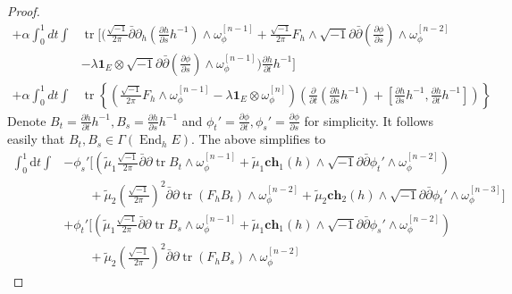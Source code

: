 \documentclass[10pt, letterpaper]{amsart}
\newcommand{\tr}{\operatorname{tr}}
\newcommand{\End}{\operatorname{End}}
\theoremstyle{plain}
\theoremstyle{definition}
\numberwithin{equation}{section}
\begin{document}
\begin{proof}
\begin{equation}
\begin{split}
     + 
    \alpha\int_0^1 dt \int 
    & \tr \Bigg[
    \Bigg(\frac{\sqrt{-1}}{2\pi}\bar\partial \partial_h\left(\frac{\partial h}{\partial s}h^{-1}\right)\wedge\omega_\phi^{[n-1]}
    + 
    \frac{\sqrt{-1}}{2\pi}F_h \wedge \sqrt{-1}\partial\bar\partial\left(\frac{\partial\phi}{\partial s}\right)\wedge\omega_\phi^{[n-2]}\\
   & -
    \lambda \mathbf{1}_E\otimes \sqrt{-1}\partial\bar\partial\left(\frac{\partial\phi}{\partial s}\right)\wedge\omega_\phi^{[n-1]}\Bigg)\frac{\partial h}{\partial t}h^{-1}
    \Bigg]\\
     + 
    \alpha\int_0^1 dt\int 
    & \tr
    \left\{ 
    \left(
    \frac{\sqrt{-1}}{2\pi}F_h\wedge \omega_\phi^{[n-1]}
    - 
    \lambda \mathbf{1}_E \otimes \omega_\phi^{[n]}\right)
    \left(\frac{\partial}{\partial t}\left( \frac{\partial h}{\partial s}h^{-1}\right)
    + 
    \left[\frac{\partial h}{\partial s}h^{-1},\frac{\partial h}{\partial t}h^{-1} \right]
    \right)
    \right\}
\end{split}
\end{equation}
Denote $B_t=\frac{\partial h}{\partial t}h^{-1}, B_s=\frac{\partial h}{\partial s}h^{-1}$ and $\phi_t'=\frac{\partial \phi}{\partial t}, \phi_s'=\frac{\partial \phi}{\partial s}$ for simplicity. It follows easily that $B_t, B_s\in \Gamma\left(\End_h E\right)$. The above simplifies to 
\begin{equation}
    \begin{split}
    \int_0^1 \mathrm{d}t \int 
    &- 
    \phi_s'
    \Bigg[ \left( \widetilde\mu_1 \frac{\sqrt{-1}}{2\pi}\bar\partial \partial \tr B_t\wedge \omega_\phi^{[n-1]} 
    + 
    \widetilde\mu_1 \mathbf{ch}_1\left(h\right)\wedge \sqrt{-1}\partial\bar\partial\phi_t'\wedge \omega_\phi^{[n-2]}\right)\\
    & \qquad + 
    \widetilde\mu_2 \left(\frac{\sqrt{-1}}{2\pi}\right)^2\bar\partial \partial \tr \left( F_h B_t\right)\wedge\omega_\phi^{[n-2]}
    + 
    \widetilde\mu_2 \mathbf{ch}_2\left(h\right)\wedge \sqrt{-1}\partial\bar\partial \phi_t'\wedge \omega_\phi^{[n-3]}\Bigg]\\
    &+ 
    \phi_t'
    \Bigg[ \left( \widetilde\mu_1 \frac{\sqrt{-1}}{2\pi}\bar\partial\partial \tr B_s\wedge \omega_\phi^{[n-1]} 
    + 
    \widetilde\mu_1 \mathbf{ch}_1\left(h\right)\wedge \sqrt{-1}\partial\bar\partial\phi_s'\wedge \omega_\phi^{[n-2]}\right)\\
    & \qquad + 
    \widetilde\mu_2 \left(\frac{\sqrt{-1}}{2\pi}\right)^2\bar\partial \partial \tr \left( F_hB_s\right)\wedge\omega_\phi^{[n-2]}

\end{split}
\end{equation}
\end{proof}
\end{document}

